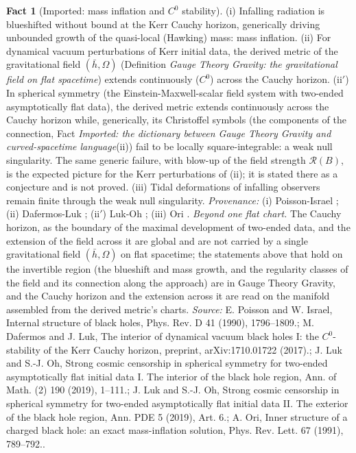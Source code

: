 \documentclass[11pt]{article}
\theoremstyle{definition}
\newtheorem{fact}[theorem]{Fact}
\theoremstyle{plain}
\newcommand{\changedmark}[2]{\marginpar{\raggedright\scriptsize\color{#1}#2}}
\providecommand{\hb}{}\renewcommand{\hb}{\bar{h}}
\begin{document}
\begin{fact}[Imported: mass inflation and $C^0$ stability]\label{c:interior.imported-mass-inflation-stability}
\changedmark{BurntOrange}{changed since the deposit}
(i) Infalling radiation is blueshifted without bound at the Kerr Cauchy horizon, generically driving unbounded growth of the quasi-local (Hawking) mass: mass inflation. (ii) For dynamical vacuum perturbations of Kerr initial data, the derived metric of the gravitational field $(\hb, \Omega)$ (Definition \emph{Gauge Theory Gravity: the gravitational field on flat spacetime}) extends continuously ($C^0$) across the Cauchy horizon. (ii$'$) In spherical symmetry (the Einstein-Maxwell-scalar field system with two-ended asymptotically flat data), the derived metric extends continuously across the Cauchy horizon while, generically, its Christoffel symbols (the components of the connection, Fact \emph{Imported: the dictionary between Gauge Theory Gravity and curved-spacetime language}(ii)) fail to be locally square-integrable: a weak null singularity. The same generic failure, with blow-up of the field strength $\mathcal{R}(B)$, is the expected picture for the Kerr perturbations of (ii); it is stated there as a conjecture and is not proved. (iii) Tidal deformations of infalling observers remain finite through the weak null singularity. \emph{Provenance:} (i) Poisson-Israel \cite{PoissonIsrael1990}; (ii) Dafermos-Luk \cite{DafermosLuk2017}; (ii$'$) Luk-Oh \cite{LukOh2019a,LukOh2019b}; (iii) Ori \cite{Ori1991}. \emph{Beyond one flat chart.} The Cauchy horizon, as the boundary of the maximal development of two-ended data, and the extension of the field across it are global and are not carried by a single gravitational field $(\hb, \Omega)$ on flat spacetime; the statements above that hold on the invertible region (the blueshift and mass growth, and the regularity classes of the field and its connection along the approach) are in Gauge Theory Gravity, and the Cauchy horizon and the extension across it are read on the manifold assembled from the derived metric's charts.
\emph{Source:} E. Poisson and W. Israel, Internal structure of black holes, Phys. Rev. D 41 (1990), 1796--1809.; M. Dafermos and J. Luk, The interior of dynamical vacuum black holes I: the $C^0$-stability of the Kerr Cauchy horizon, preprint, arXiv:1710.01722 (2017).; J. Luk and S.-J. Oh, Strong cosmic censorship in spherical symmetry for two-ended asymptotically flat initial data I. The interior of the black hole region, Ann. of Math. (2) 190 (2019), 1--111.; J. Luk and S.-J. Oh, Strong cosmic censorship in spherical symmetry for two-ended asymptotically flat initial data II. The exterior of the black hole region, Ann. PDE 5 (2019), Art. 6.; A. Ori, Inner structure of a charged black hole: an exact mass-inflation solution, Phys. Rev. Lett. 67 (1991), 789--792..
\end{fact}
\end{document}
